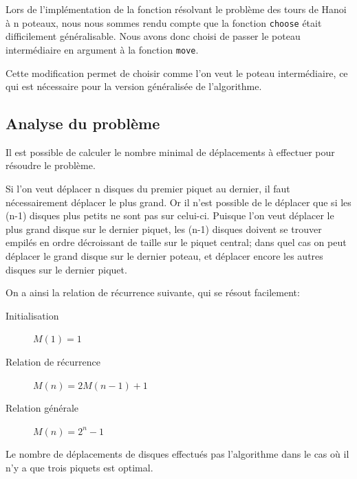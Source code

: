 \documentclass[a4paper, 11pt]{article}%
\begin{document}
		Lors de l'implémentation de la fonction résolvant le problème des tours
		de Hanoi à n poteaux, nous nous sommes rendu compte que la fonction
		\texttt{choose} était difficilement généralisable. Nous avons donc choisi
		de passer le poteau intermédiaire en argument à la fonction \texttt{move}.

		Cette modification permet de choisir comme l'on veut le poteau intermédiaire,
		ce qui est nécessaire pour la version généralisée de l'algorithme.
	
	\subsection{Analyse du problème}
		
		Il est possible de calculer le nombre minimal de déplacements à effectuer
		pour résoudre le problème.
		
		Si l'on veut déplacer n disques du premier piquet au dernier, il
		faut nécessairement déplacer le plus grand. Or il n'est possible
		de le déplacer que si les (n-1) disques plus petits ne sont pas
		sur celui-ci. Puisque l'on veut déplacer le plus grand disque sur
		le dernier piquet, les (n-1) disques doivent se trouver empilés
		en ordre décroissant de taille sur le piquet central; dans quel
		cas on peut déplacer le grand disque sur le dernier poteau, et
		déplacer encore les autres disques sur le dernier piquet.
		
		On a ainsi la relation de récurrence suivante, qui se résout facilement:
		
		\begin{description}
			\item[Initialisation] $M(1) = 1$
			\item[Relation de récurrence] $M(n) = 2M(n-1) + 1$
			\item[Relation générale] $M(n) = 2^n - 1$
		\end{description}
		
		Le nombre de déplacements de disques effectués pas l'algorithme
		dans le cas où il n'y a que trois piquets est optimal.
				
\end{document}
